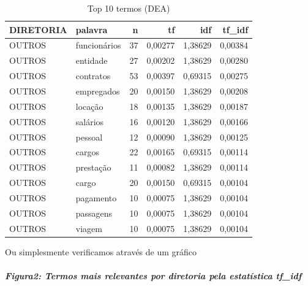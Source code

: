 \documentclass[]{article}
\newenvironment{Shaded}{\begin{snugshade}}{\end{snugshade}}
\newcommand{\DataTypeTok}[1]{\textcolor[rgb]{0.13,0.29,0.53}{#1}}
\newcommand{\KeywordTok}[1]{\textcolor[rgb]{0.13,0.29,0.53}{\textbf{#1}}}
\newcommand{\NormalTok}[1]{#1}
\newcommand{\OperatorTok}[1]{\textcolor[rgb]{0.81,0.36,0.00}{\textbf{#1}}}
\newcommand{\OtherTok}[1]{\textcolor[rgb]{0.56,0.35,0.01}{#1}}
\newcommand{\StringTok}[1]{\textcolor[rgb]{0.31,0.60,0.02}{#1}}
\let\oldsubparagraph\subparagraph
\renewcommand{\subparagraph}[1]{\oldsubparagraph{#1}\mbox{}}
\begin{document}
\begin{table}[!h]

\caption{\label{tab:unnamed-chunk-46}Top 10 termos (DEA)}
\centering
\begin{tabular}{llrrrr}
\toprule
DIRETORIA & palavra & n & tf & idf & tf\_idf\\
\midrule
\rowcolor{gray!6}  OUTROS & funcionários & 37 & 0,00277 & 1,38629 & 0,00384\\
OUTROS & entidade & 27 & 0,00202 & 1,38629 & 0,00280\\
\rowcolor{gray!6}  OUTROS & contratos & 53 & 0,00397 & 0,69315 & 0,00275\\
OUTROS & empregados & 20 & 0,00150 & 1,38629 & 0,00208\\
\rowcolor{gray!6}  OUTROS & locação & 18 & 0,00135 & 1,38629 & 0,00187\\
\addlinespace
OUTROS & salários & 16 & 0,00120 & 1,38629 & 0,00166\\
\rowcolor{gray!6}  OUTROS & pessoal & 12 & 0,00090 & 1,38629 & 0,00125\\
OUTROS & cargos & 22 & 0,00165 & 0,69315 & 0,00114\\
\rowcolor{gray!6}  OUTROS & prestação & 11 & 0,00082 & 1,38629 & 0,00114\\
OUTROS & cargo & 20 & 0,00150 & 0,69315 & 0,00104\\
\addlinespace
\rowcolor{gray!6}  OUTROS & pagamento & 10 & 0,00075 & 1,38629 & 0,00104\\
OUTROS & passagens & 10 & 0,00075 & 1,38629 & 0,00104\\
\rowcolor{gray!6}  OUTROS & viagem & 10 & 0,00075 & 1,38629 & 0,00104\\
\bottomrule
\end{tabular}
\end{table}

Ou simplesmente verificamos através de um gráfico

\hypertarget{figura2-termos-mais-relevantes-por-diretoria-pela-estatistica-tf_idf}{%
\subparagraph{\texorpdfstring{Figura2: Termos mais relevantes por
diretoria pela estatística
\textbf{tf\_idf}}{Figura2: Termos mais relevantes por diretoria pela estatística tf\_idf}}\label{figura2-termos-mais-relevantes-por-diretoria-pela-estatistica-tf_idf}}

\begin{Shaded}
\end{Shaded}
\end{document}
